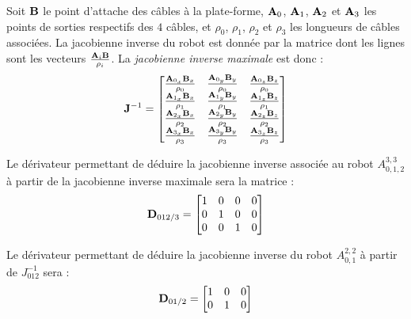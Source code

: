 Soit ${\bf B}$ le point d'attache des c\^ables \`a la plate-forme, ${\bf 
A}_0$, ${\bf A}_1$, ${\bf A}_2$ et ${\bf A}_3$ les points de sorties 
respectifs des $4$ c\^ables, et $\rho_0$, $\rho_1$, $\rho_2$ et $\rho_3$ les 
longueurs de c\^ables associ\'ees. La jacobienne inverse du robot est donn\'ee 
par la matrice dont les lignes sont les vecteurs $\frac {{\bf A}_i{\bf 
B}}{\rho_i}$. La {\it jacobienne inverse maximale} est donc :
\begin{equation}
{\bf J}^{-1} = 
\begin{bmatrix}
\frac {{\bf A}_{0_x}{\bf B}_x} {\rho_0} & \frac {{\bf A}_{0_y}{\bf B}_y} 
{\rho_0} & \frac {{\bf A}_{0_z}{\bf B}_z} {\rho_0} \\
\frac {{\bf A}_{1_x}{\bf B}_x} {\rho_1} & \frac {{\bf A}_{1_y}{\bf B}_y} 
{\rho_1} & \frac {{\bf A}_{1_z}{\bf B}_z} {\rho_1} \\
\frac {{\bf A}_{2_x}{\bf B}_x} {\rho_2} & \frac {{\bf A}_{2_y}{\bf B}_y} 
{\rho_2} & \frac {{\bf A}_{2_z}{\bf B}_z} {\rho_2} \\
\frac {{\bf A}_{3_x}{\bf B}_x} {\rho_3} & \frac {{\bf A}_{3_y}{\bf B}_y} 
{\rho_3} & \frac {{\bf A}_{3_z}{\bf B}_z} {\rho_3} \\
\end{bmatrix}
\label{chap03:eq01}
\end{equation}

Le d\'erivateur permettant de d\'eduire la jacobienne inverse associ\'ee au 
robot $A^{3,3}_{0, 1, 2}$ \`a partir de la jacobienne inverse maximale 
sera la matrice :
\begin{equation}
{\bf D}_{012/3} = 
\begin{bmatrix}
1 & 0 & 0 & 0\\
0 & 1 & 0 & 0\\
0 & 0 & 1 & 0
\end{bmatrix}
\label{chap03:eq02}
\end{equation}

Le d\'erivateur permettant de d\'eduire la jacobienne inverse du robot 
$A^{2,2}_{0, 1}$ \`a partir de $J^{-1}_{012}$ sera :
\begin{equation}
{\bf D}_{01/2} = 
\begin{bmatrix}
1 & 0 & 0\\
0 & 1 & 0
\end{bmatrix}
\label{chap03:eq03}
\end{equation}

